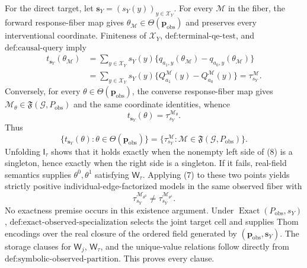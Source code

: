 For the direct target, let \(\mathbf s_Y=(s_Y(y))_{y\in\mathcal X_Y}\).  For every \(\mathcal M\) in the fiber, the forward response-fiber map gives \(\theta_{\mathcal M}\in\Theta(\mathbf p_{\mathrm{obs}})\) and preserves every interventional coordinate.  Finiteness of \(\mathcal X_Y\), \(\text{def:terminal-qe-test}\), and \(\text{def:causal-query}\) imply
\[
\begin{aligned}
t_{\mathbf s_Y}(\theta_{\mathcal M})
&=\sum_{y\in\mathcal X_Y}s_Y(y)
\{q_{a_1,y}(\theta_{\mathcal M})-q_{a_0,y}(\theta_{\mathcal M})\}\\
&=\sum_{y\in\mathcal X_Y}s_Y(y)
\{Q_{a_1}^{\mathcal M}(y)-Q_{a_0}^{\mathcal M}(y)\}
=\tau_{s_Y}^{\mathcal M}.
\end{aligned}
\tag{6}
\]
Conversely, for every \(\theta\in\Theta(\mathbf p_{\mathrm{obs}})\), the converse response-fiber map gives \(\mathcal M_\theta\in\mathfrak F(\mathcal G,P_{\mathrm{obs}})\) and the same coordinate identities, whence
\[
t_{\mathbf s_Y}(\theta)=\tau_{s_Y}^{\mathcal M_\theta}.
\tag{7}
\]
Thus
\[
\{t_{\mathbf s_Y}(\theta):\theta\in\Theta(\mathbf p_{\mathrm{obs}})\}
=\{\tau_{s_Y}^{\mathcal M}:\mathcal M\in\mathfrak F(\mathcal G,P_{\mathrm{obs}})\}.
\tag{8}
\]
Unfolding \(\mathsf I_\tau\) shows that it holds exactly when the nonempty left side of (8) is a singleton, hence exactly when the right side is a singleton.  If it fails, real-field semantics supplies \(\theta^0,\theta^1\) satisfying \(\mathsf W_\tau\).  Applying (7) to these two points yields strictly positive individual-edge-factorized models in the same observed fiber with
\[
\tau_{s_Y}^{\mathcal M_{\theta^0}}
\neq
\tau_{s_Y}^{\mathcal M_{\theta^1}}.
\tag{9}
\]
No exactness premise occurs in this existence argument.  Under \(\operatorname{Exact}(P_{\mathrm{obs}},s_Y)\), \(\text{def:exact-observed-specialization}\) selects the joint target cell and supplies Thom encodings over the real closure of the ordered field generated by \((\mathbf p_{\mathrm{obs}},\mathbf s_Y)\).  The storage clauses for \(\mathsf W_j\), \(\mathsf W_\tau\), and the unique-value relations follow directly from \(\text{def:symbolic-observed-partition}\).  This proves every clause.